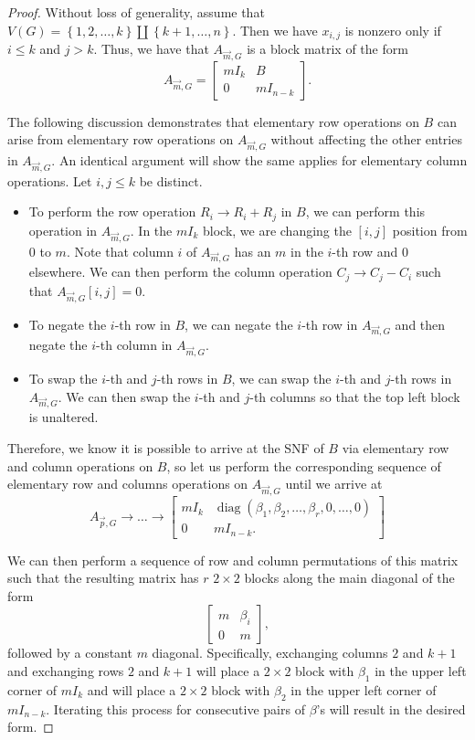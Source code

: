 \documentclass[12pt]{amsart}
\theoremstyle{definition}
\numberwithin{equation}{section}
\renewcommand\>{\rangle}
\newcommand\<{\langle}
\newcommand\0{\mathbf{0}}
\newcommand\set[1]{\left\{#1\right\}}
\DeclareMathOperator{\diag}{diag}
\begin{document}
\begin{proof}
	Without loss of generality, assume that $V(G) = \set{1,2,\dots,k} \amalg \set{k+1,\dots,n}$. 
	Then we have $x_{i,j}$ is nonzero only if $i \leq k$ and $j > k$. Thus, we have that $A_{\vec{m}, G}$ is a block matrix of the form
	\[A_{\vec{m}, G} = \begin{bmatrix}
		mI_k & B \\
		0 & mI_{n-k}
	\end{bmatrix}.\]
	
	The following discussion demonstrates that elementary row operations on $B$ can arise from elementary row operations on $A_{\vec{m} ,G}$ without affecting the other entries in $A_{\vec{m} ,G}$. 
	An identical argument will show the same applies for elementary column operations. 
	Let $i,j \leq k$ be distinct.
	\begin{itemize}
		\item To perform the row operation $R_i \to R_i + R_j$ in $B$, we can perform this operation in $A_{\vec{m}, G}$. In the $mI_k$ block, we are changing the $[i,j]$ position from 0 to $m$. 
		Note that column $i$ of $A_{\vec{m}, G}$ has an $m$ in the $i$-th row and 0 elsewhere. 
		We can then perform the column operation $C_j \to C_j - C_i$ such that $A_{\vec{m}, G}[i,j] = 0$. 
		\item To negate the $i$-th row in $B$, we can negate the $i$-th row in $A_{\vec{m}, G}$ and then negate the $i$-th column in $A_{\vec{m}, G}$.
		\item To swap the $i$-th and $j$-th rows in $B$, we can swap the $i$-th and $j$-th rows in $A_{\vec{m}, G}$. We can then swap the $i$-th and $j$-th columns so that the top left block is unaltered.
	\end{itemize}
	
	Therefore, we know it is possible to arrive at the SNF of $B$ via elementary row and column operations on $B$, so let us perform the corresponding sequence of elementary row and columns operations on $A_{\vec{m}, G}$ until we arrive at 
	\[A_{\vec{p}, G} \to \dots \to \begin{bmatrix}
		mI_k & \diag(\beta_1,\beta_2, \dots, \beta_r, 0, \dots, 0) \\
		0 & mI_{n-k}.
	\end{bmatrix}\]
	
	We can then perform a sequence of row and column permutations of this matrix such that the resulting matrix has $r$ $2\times 2$ blocks along the main diagonal of the form
	\[
	\begin{bmatrix}
		m & \beta_i \\ 0 & m
	\end{bmatrix},
	\]
	followed by a constant $m$ diagonal. 
	Specifically, exchanging columns $2$ and $k+1$ and exchanging rows $2$ and $k+1$ will place a $2\times 2$ block with $\beta_1$ in the upper left corner of $mI_k$ and will place a $2\times 2$ block with $\beta_2$ in the upper left corner of $mI_{n-k}$.
	Iterating this process for consecutive pairs of $\beta$'s will result in the desired form. 	
	

\end{proof}
\end{document}
